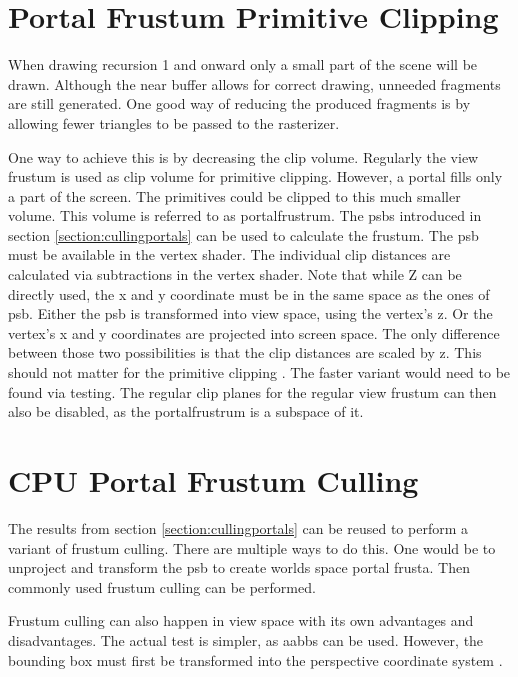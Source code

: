\section{Portal Frustum Primitive Clipping}
\label{section:portalprimitiveclipping}

When drawing recursion 1 and onward only a small part of the scene will be drawn. Although the near buffer allows for correct drawing, unneeded fragments are still generated. One good way of reducing the produced fragments is by allowing fewer triangles to be passed to the rasterizer. 

One way to achieve this is by decreasing the clip volume. Regularly the view frustum is used as clip volume for primitive clipping. However, a portal fills only a part of the screen. The primitives could be clipped to this much smaller volume. This volume is referred to as \gls{portalfrustrum}. The \glspl{psb} introduced in section \ref{section:cullingportals} can be used to calculate the frustum. The \gls{psb} must be available in the vertex shader. The individual clip distances are calculated via subtractions in the vertex shader. Note that while Z can be directly used, the x and y coordinate must be in the same space as the ones of \gls{psb}. Either the \gls{psb} is transformed into view space, using the vertex's z. Or the vertex's x and y coordinates are projected into screen space. The only difference between those two possibilities is that the clip distances are scaled by z. This should not matter for the primitive clipping \cite{khronos:vulkan:spec1.1}. The faster variant would need to be found via testing. The regular clip planes for the regular view frustum can then also be disabled, as the \gls{portalfrustrum} is a subspace of it.

\section{CPU Portal Frustum Culling}
\label{section:portalfrustumculling}
The results from section \ref{section:cullingportals} can be reused to perform a variant of frustum culling. There are multiple ways to do this. One would be to unproject and transform the \gls{psb} to create worlds space portal frusta. Then commonly used frustum culling can be performed.

Frustum culling can also happen in view space with its own advantages and disadvantages. The actual test is simpler, as \glspl{aabb} can be used. However, the bounding box must first be transformed into the perspective coordinate system \cite{assarsson:2000:optimized}.


